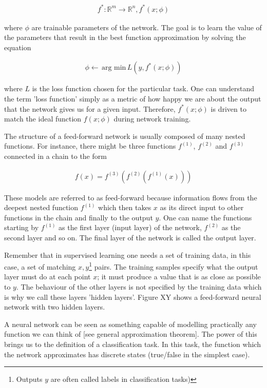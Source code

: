\begin{gather}
f^*: \mathbb{R}^m \rightarrow \mathbb{R}^n, f^*(x;\phi)
\end{gather}

\noindent where $ \phi $ are trainable parameters of the network. The goal is to learn the value of the parameters that result in the best function approximation by solving the equation

\begin{gather}
\phi \leftarrow \, \text{arg min} \, L(y, f^*(x;\phi))
\end{gather}

\noindent where $ L $ is the loss function chosen for the particular task. One can understand the term 'loss function' simply as a metric of how happy we are about the output that the network gives us for a given input. Therefore, $f^*(x;\phi)$ is driven to match the ideal function $f(x;\phi)$ during network training. 

The structure of a feed-forward network is usually composed of many nested functions. For instance, there might be three functions $f^{(1)}$, $f^{(2)}$ and $f^{(3)}$ connected in a chain to the form

\begin{gather}
f(x) = f^{(3)}(f^{(2)}(f^{(1)}(x)))
\end{gather}

These models are referred to as feed-forward because information flows from the deepest nested function $f^{(1)}$ which then takes $ x $ as its direct input to other functions in the chain and finally to the output $ y $. One can name the functions starting by $f^{(1)}$ as the first layer (input layer) of the network, $f^{(2)}$ as the second layer and so on. The final layer of the network is called the output layer. 

Remember that in supervised learning one needs a set of training data, in this case, a set of matching $ x, y $\footnote{Outputs $ y $ are often called labels in classification tasks)}  pairs. The training samples specify what the output layer must do at each point $ x $; it must produce a value that is as close as possible to $ y $. The behaviour of the other layers is not specified by the training data which is why we call these layers 'hidden layers'. Figure XY shows a feed-forward neural network with two hidden layers.

A neural network can be seen as something capable of modelling practically any function we can think of [see general approximation theorem]. The power of this brings us to the definition of a classification task. In this task, the function which the network approximates has discrete states (true/false in the simplest case). 

